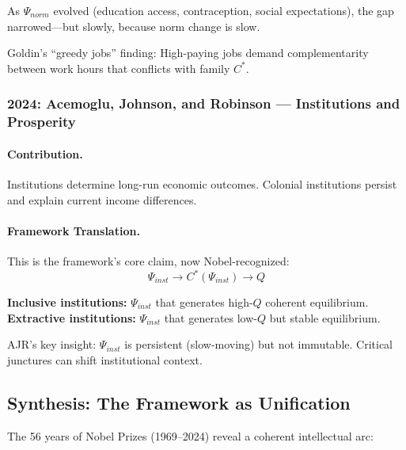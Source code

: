 \documentclass[12pt,a4paper]{article}
\begin{document}
As $\Psi_{norm}$ evolved (education access, contraception, social expectations),
the gap narrowed---but slowly, because norm change is slow.

Goldin's ``greedy jobs'' finding: High-paying jobs demand complementarity
between work hours that conflicts with family $C^*$.

\subsubsection{2024: Acemoglu, Johnson, and Robinson --- Institutions and Prosperity}

\paragraph{Contribution.}
Institutions determine long-run economic outcomes. Colonial institutions
persist and explain current income differences.

\paragraph{Framework Translation.}
This is the framework's core claim, now Nobel-recognized:
\begin{equation}
  \Psi_{inst} \to C^*(\Psi_{inst}) \to Q
\end{equation}

\textbf{Inclusive institutions:} $\Psi_{inst}$ that generates high-$Q$ coherent equilibrium.
\textbf{Extractive institutions:} $\Psi_{inst}$ that generates low-$Q$ but stable equilibrium.

AJR's key insight: $\Psi_{inst}$ is persistent (slow-moving) but not immutable.
Critical junctures can shift institutional context.

\subsection{Synthesis: The Framework as Unification}

The 56 years of Nobel Prizes (1969--2024) reveal a coherent intellectual arc:
\end{document}

